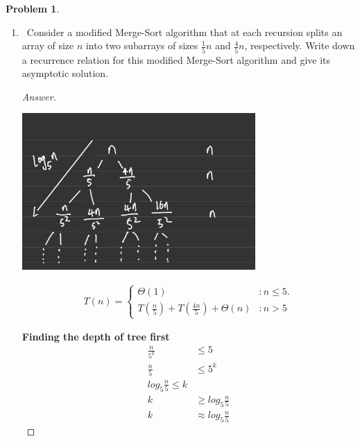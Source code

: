 \documentclass[11pt]{article}
\theoremstyle{definition}
\theoremstyle{definition}
\newtheorem{required}{Problem}
\theoremstyle{definition}
\begin{document}
\begin{required}
\begin{enumerate}[label=(\alph*)]
\begin{proof}[Answer]
\textbf{Total run time complexity:\\}
\begin{align*}
\frac{n-4}{4} \cdot n &= \frac{n^2-4n}{4}\\
\end{align*}

\textbf{Asymptotic Solution:\\}
\begin{align*}
\lim _{n\to \infty }\:\frac{\frac{n^2-4n}{4}}{n^2} &= \lim _{n\to \infty }\:\frac{2n-4}{8n}\\
&= 1/4
\end{align*}
\textbf{This modified Merge Sort Algorithm has tight bound as $\Theta(n^2)$}
\end{proof}

\newpage

\item \label{(b)}~Consider a modified Merge-Sort algorithm that at each recursion splits an array of size $n$  into two subarrays of sizes $\frac{1}{5}n$ and $\frac{4}{5}n$, respectively. Write down a recurrence relation for this modified Merge-Sort algorithm and give its asymptotic solution.


\begin{proof}[Answer]
\begin{center}
\includegraphics[width=0.7\textwidth]{HW6_Q1(b).PNG}
\end{center}

\begin{align*}
T(n) = \begin{cases}
\Theta(1)& : n \leq 5.\\
T(\frac{n}{5}) + T(\frac{4n}{5}) +\Theta(n)& : n > 5
\end{cases}
\end{align*}


\textbf{Finding the depth of tree first}
\begin{align*}
\frac{n}{5^k} & \leq 5\\
\frac{n}{5} & \leq 5^k \\
log_5 \frac{n}{5} \leq k\\
k &\geq log_5 \frac{n}{5}\\
k &\approx   log_5 \frac{n}{5}
\end{align*}


\end{proof}
\end{enumerate}
\end{required}
\end{document}
